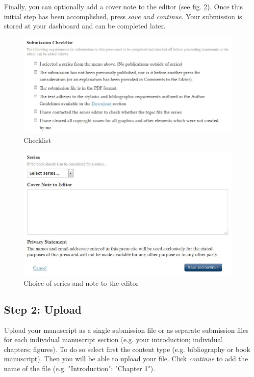 Finally, you can optionally add a cover note to the editor (see fig. \ref{fig:submission3}). Once this initial step has been accomplished, press \textit{save and continue}. Your submission is stored at your dashboard and can be completed later.

\begin{figure}[h] \centering 
\includegraphics[width=1\textwidth]{./img/checklist.jpg} 
\caption{Checklist}
\label{fig:checklist}
\end{figure}

\begin{figure}[h]
\centering
\includegraphics[width=1\textwidth]{./img/submission-3.jpg}
\caption{Choice of series and note to the editor}
\label{fig:submission3}
\end{figure}

\newpage

\subsection*{Step 2: Upload}
Upload your manuscript as a single submission file or as separate submission files for each individual manuscript section (e.g. your introduction; individual chapters; figures). To do so select first the content type (e.g. bibliography or book manuscript). Then you will be able to upload your file. Click \textit{continue} to add the name of the file (e.g. "Introduction"; "Chapter 1").

